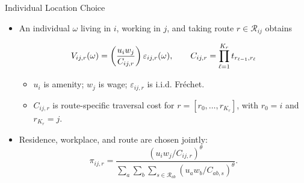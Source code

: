 \documentclass[11pt,aspectratio=169]{beamer}
\newcommand{\R}{\mathcal{R}}
\begin{document}
\begin{frame}{Individual Location Choice}
\begin{itemize}\small
  \item An individual $\omega$ living in $i$, working in $j$, and taking route $r\in\R_{ij}$ obtains
  \vspace{-0.5em}\begin{footnotesize}\begin{equation}\label{eq:routecost}
    V_{ij,r}(\omega) = \left( \frac{u_i w_j}{C_{ij,r}} \right)\varepsilon_{ij,r}(\omega),
    \qquad
    C_{ij,r} = \prod_{\ell=1}^{K_r} t_{r_{\ell-1},r_\ell}
  \vspace{-1.25em}\end{equation}\end{footnotesize}
  \begin{itemize}\footnotesize
    \item $u_i$ is amenity; $w_j$ is wage; $\varepsilon_{ij,r}$ is i.i.d. Fr\'echet.
    \item $C_{ij,r}$ is route-specific traversal cost for $r=[r_0,\ldots,r_{K_r}]$, with $r_0=i$ and $r_{K_r}=j$.
  \end{itemize}
  \vspace{0.25em}
  \item Residence, workplace, and route are chosen jointly:
  \vspace{-0.5em}\begin{equation}\label{eq:pi}
    \pi_{ij,r} = \frac{\left(u_i w_j/C_{ij,r}\right)^\theta}{\sum_{a}\sum_b\sum_{s\in\R_{ab}}\left(u_a w_b/C_{ab,s}\right)^\theta}.
  \end{equation}
\end{itemize}
\end{frame}
\end{document}
